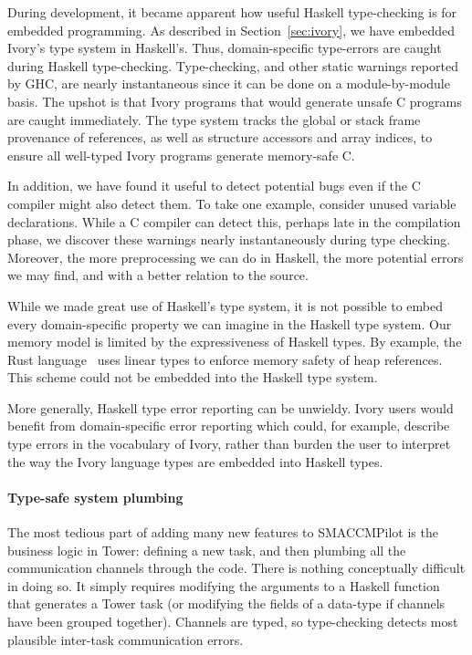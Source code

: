 During development, it became apparent how useful Haskell type-checking
is for embedded programming.  As described in Section~\ref{sec:ivory}, we
have embedded Ivory's type system in Haskell's.  Thus, domain-specific
type-errors are caught during Haskell type-checking.  Type-checking, and other
static warnings reported by GHC, are nearly instantaneous
since it can be done on a module-by-module basis.  The upshot is that Ivory
programs that would generate unsafe C programs are caught immediately.
The type system tracks the global or stack frame provenance of
references, as well as structure accessors and array indices, to ensure
all well-typed Ivory programs generate memory-safe C.

In addition, we have found it useful to detect potential bugs even if the C
compiler might also detect them.  To take one example, consider unused variable
declarations.  While a C compiler can detect this, perhaps late in the
compilation phase, we discover these warnings nearly instantaneously during type
checking.  Moreover, the more preprocessing we can do in Haskell, the more
potential errors we may find, and with a better relation to the source.


While we made great use of Haskell's type system, it is not possible to embed
every domain-specific property we can imagine in the Haskell type system. Our
memory model is limited by the expressiveness of Haskell types. By example, the
Rust language~\cite{rust} uses linear types to enforce memory safety of heap
references. This scheme could not be embedded into the Haskell type system.

More generally, Haskell type error reporting can be unwieldy. Ivory users
would benefit from domain-specific error reporting which could, for example,
describe type errors in the vocabulary of Ivory, rather than burden the user to
interpret the way the Ivory language types are embedded into Haskell types.

\paragraph{Type-safe system plumbing}
The most tedious part of adding many new features to SMACCMPilot is the business
logic in Tower: defining a new task, and then plumbing all the communication
channels through the code.  There is nothing conceptually difficult in doing so.
It simply requires modifying the arguments to a Haskell function that generates
a Tower task (or modifying the fields of a data-type if channels have been
grouped together).  Channels are typed, so type-checking detects most plausible
inter-task communication errors.

